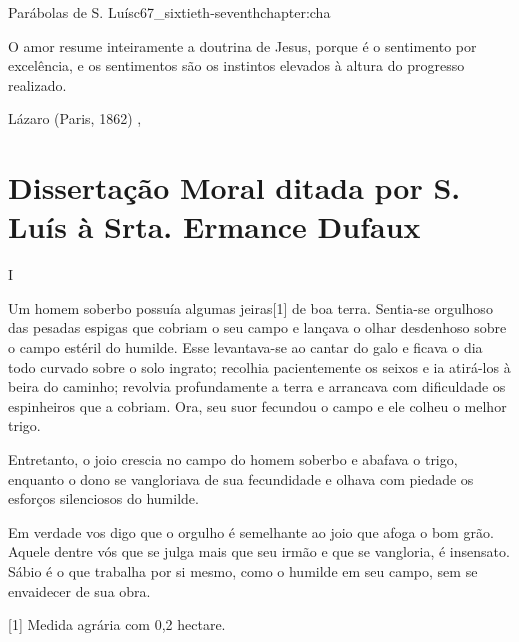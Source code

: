 \begin{chapterpage}{Parábolas de S. Luís}{c67_sixtieth-seventhchapter:cha}
 
\begin{myquotation} O amor resume inteiramente a doutrina de Jesus, porque é o sentimento por excelência, e os sentimentos são os instintos elevados à altura do progresso realizado.
\par\vspace*{15mm}
\mbox{}\hfill \emdash{}Lázaro (Paris, 1862)
, %
\par\end{myquotation}

\end{chapterpage}



\section{Dissertação Moral ditada por S. Luís à Srta. Ermance Dufaux}\label{c1_basicformatting:sec}

\begin{center}
I
\end{center}
 

\emdash{}Um homem soberbo possuía algumas jeiras[1] de boa terra. Sentia-se orgulhoso das pesadas espigas que cobriam o seu campo e lançava o olhar desdenhoso sobre o campo estéril do humilde. Esse levantava-se ao cantar do galo e ficava o dia todo curvado sobre o solo ingrato; recolhia pacientemente os seixos e ia atirá-los à beira do caminho; revolvia profundamente a terra e arrancava com dificuldade os espinheiros que a cobriam. Ora, seu suor fecundou o campo e ele colheu o melhor trigo.

\emdash{}Entretanto, o joio crescia no campo do homem soberbo e abafava o trigo, enquanto o dono se vangloriava de sua fecundidade e olhava com piedade os esforços silenciosos do humilde.

\emdash{}Em verdade vos digo que o orgulho é semelhante ao joio que afoga o bom grão. Aquele dentre vós que se julga mais que seu irmão e que se vangloria, é insensato. Sábio é o que trabalha por si mesmo, como o humilde em seu campo, sem se envaidecer de sua obra.

[1] Medida agrária com 0,2 hectare.

